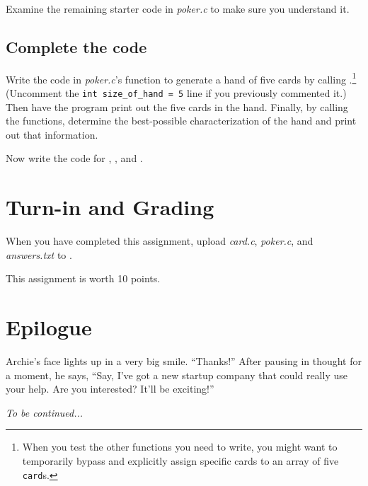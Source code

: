 Examine the remaining starter code in \textit{poker.c} to make sure you
understand it.

\subsection{Complete the code}

Write the code in \textit{poker.c}'s  function to generate a
hand of five cards by calling .\footnote{When you test the
other functions you need to write, you might want to temporarily bypass
 and explicitly assign specific cards to an array of five
\lstinline{card}s.}  (Uncomment the \lstinline{int size_of_hand = 5} line if you
previously commented it.)  Then have the program print out the five cards in
the hand. Finally, by calling the  functions, determine the
best-possible characterization of the hand and print out that information.

Now write the code for , , and
.

\section{Turn-in and Grading}

When you have completed this assignment, upload \textit{card.c},
\textit{poker.c}, and \textit{answers.txt} to \filesubmission.

This assignment is worth 10 points.
\begin{description}
\end{description}

\section*{Epilogue}

Archie's face lights up in a very big smile. ``Thanks!'' After pausing in
thought for a moment, he says, ``Say, I've got a new startup company that could
really use your help. Are you interested? It'll be exciting!''

\textit{To be continued...}


